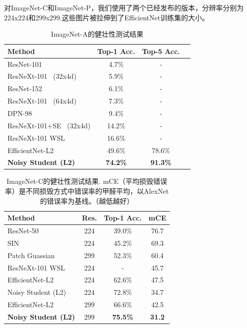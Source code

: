 \documentclass[10pt]{article}
\begin{document}
对ImageNet-C和ImageNet-P，我们使用了两个已经发布的版本，分辨率分别为224x224和299x299.这些图片被拉伸到了EfficientNet训练集的大小。  

\begin{table}[h!]
	\small
	\centering 
	\begin{tabular}{l|ccc}                                                
		\toprule 
		Method &  Top-1 Acc. & Top-5 Acc. \\
		\midrule      
		ResNet-101~\cite{hendrycks2019natural} & 4.7\% & - \\
		ResNeXt-101~\cite{hendrycks2019natural} (32x4d) & 5.9\% & -  \\
		ResNet-152~\cite{hendrycks2019natural} & 6.1\% & - \\
		ResNeXt-101~\cite{hendrycks2019natural} (64x4d) & 7.3\% & - \\
		DPN-98~\cite{hendrycks2019natural} & 9.4\% & - \\
		ResNeXt-101+SE~\cite{hendrycks2019natural} (32x4d) &  14.2\% & - \\
		ResNeXt-101 WSL~\cite{mahajan2018exploring,orhan2019robustness} & 16.6\% & - \\
		\midrule
		EfficientNet-L2  &  49.6\% & 78.6\%   \\
		\bf Noisy Student (L2) & \bf 74.2\% & \bf 91.3\%  \\
		\bottomrule
	\end{tabular}
	\caption{ImageNet-A的健壮性测试结果}  
	\label{tab:robustness1}
\end{table}


\begin{table}[h!]
	\small
	\centering 
	\begin{tabular}{l|c|cc}         
		\toprule 
		Method & Res. & Top-1 Acc. & mCE \\
		\midrule
		ResNet-50 \cite{hendrycks2018benchmarking} & 224 & 39.0\% & 76.7 \\
		SIN \cite{geirhos2018imagenet} &224 & 45.2\% & 69.3 \\
		Patch Guassian \cite{lopes2019improving}  & 299 & 52.3\% & 60.4 \\
		ResNeXt-101 WSL~\cite{mahajan2018exploring,orhan2019robustness} & 224 & - & 45.7 \\
		\midrule
		EfficientNet-L2  & 224 &  62.6\% &  47.5 \\
		Noisy Student (L2) & 224  &  72.8\% &  34.7 \\
		
		EfficientNet-L2  & 299 & 66.6\% & 42.5  \\
		\bf Noisy Student (L2) & 299 & \bf 75.5\% & \bf 31.2 \\
		\bottomrule
	\end{tabular}
	\caption{ImageNet-C的健壮性测试结果. mCE（平均损毁错误率）是不同损毁方式中错误率的甲醛平均，以AlexNet的错误率为基线。（越低越好）}  
	\label{tab:robustness2}
\end{table}
\end{document}
